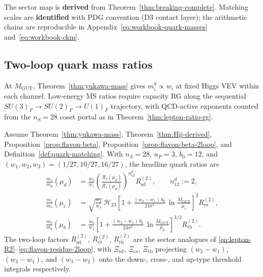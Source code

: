 \begin{remark}
The sector map is \textbf{derived} from Theorem~\ref{thm:breaking-complete}.
Matching scales are \textbf{identified} with PDG convention (D3 contact layer);
the arithmetic chains are reproducible in
Appendix~\eqref{eq:workbook-quark-masses} and~\eqref{eq:workbook-ckm}.
\end{remark}

\subsection{Two-loop quark mass ratios}
\label{sec:quark-precision:masses}

At $M_{\mathrm{GUT}}$, Theorem~\ref{thm:yukawa-mass} gives
$m_i^q\propto w_i$ at fixed Higgs VEV within each channel.
Low-energy $\overline{\mathrm{MS}}$ ratios require capacity RG along the
sequential $SU(3)_F\to SU(2)_F\to U(1)_F$ trajectory, with QCD-active
exponents counted from the $n_S=28$ coset portal as in
Theorem~\ref{thm:lepton-ratio-rg}.

\begin{theorem}
\label{thm:quark-mass-2loop}
Assume Theorem~\ref{thm:yukawa-mass}, Theorem~\ref{thm:Hij-derived},
Proposition~\ref{prop:flavon-beta}, Proposition~\ref{prop:flavon-beta-2loop},
and Definition~\ref{def:quark-matching}. With
$n_S=28$, $n_F=3$, $b_0=12$, and $(w_1,w_2,w_3)=(1/27,10/27,16/27)$,
the headline quark ratios are
\begin{align}
  \frac{m_s}{m_d}(\mu_d)
  &=
  \frac{w_2}{w_1}
  \left(
    \frac{\mathcal{R}_2(\mu_d)}{\mathcal{R}_1(\mu_d)}
  \right)^{\!n_{12}^{d}}
  R_{\mathrm{sd}}^{(2)},
  \qquad
  n_{12}^{d} := 2,
  \label{eq:ms-md}\\
  \frac{m_c}{m_s}(\mu_c)
  &=
  \sqrt{\frac{w_3}{w_1}}\,
  \mathcal{H}_{23}
  \left[
    1
    +
    \frac{(w_3-w_1)\,b_0}{24\pi^2}\,
    \ln\!\frac{M_{\mathrm{GUT}}}{\mu_c}
  \right]^{\!2}
  R_{\mathrm{cs}}^{(2)},
  \label{eq:mc-ms}\\
  \frac{m_t}{m_b}(\mu_b)
  &=
  \frac{w_3}{w_1}
  \left[
    1
    +
    \frac{(w_3-w_1)\,b_0}{24\pi^2}\,
    \ln\!\frac{M_{\mathrm{GUT}}}{\mu_b}
  \right]^{\!3/2}
  R_{\mathrm{tb}}^{(2)}.
  \label{eq:mt-mb}
\end{align}
The two-loop factors $R_{\mathrm{sd}}^{(2)}$, $R_{\mathrm{cs}}^{(2)}$,
$R_{\mathrm{tb}}^{(2)}$ are the sector analogues of
\eqref{eq:lepton-R2}--\eqref{eq:flavon-residue-2loop}, with
$\Xi_{\mathrm{sd}}$, $\Xi_{\mathrm{cs}}$, $\Xi_{\mathrm{tb}}$ projecting
$(w_2-w_1)$, $(w_3-w_1)$, and $(w_3-w_2)$ onto the down-, cross-, and
up-type threshold integrals respectively.
\end{theorem}

